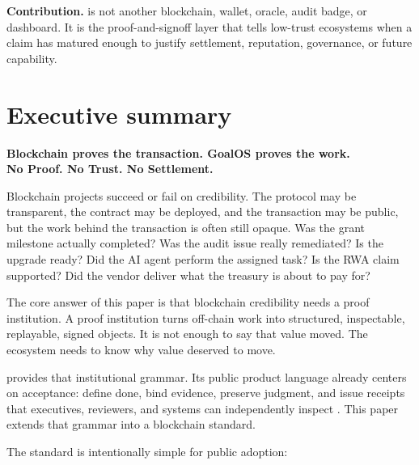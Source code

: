 \begin{thesisbox}
\textbf{Contribution.} \Signoff{} is not another blockchain, wallet, oracle, audit badge, or dashboard. It is the proof-and-signoff layer that tells low-trust ecosystems when a claim has matured enough to justify settlement, reputation, governance, or future capability.
\end{thesisbox}

\tableofcontents
\newpage
{}

\section{Executive summary}

\begin{standardbox}
\begin{center}
{\Large\bfseries Blockchain proves the transaction. GoalOS proves the work.}\\[4pt]
{\large\bfseries No Proof. No Trust. No Settlement.}
\end{center}
\end{standardbox}

Blockchain projects succeed or fail on credibility. The protocol may be transparent, the contract may be deployed, and the transaction may be public, but the work behind the transaction is often still opaque. Was the grant milestone actually completed? Was the audit issue really remediated? Is the upgrade ready? Did the AI agent perform the assigned task? Is the RWA claim supported? Did the vendor deliver what the treasury is about to pay for?

The core answer of this paper is that blockchain credibility needs a proof institution. A proof institution turns off-chain work into structured, inspectable, replayable, signed objects. It is not enough to say that value moved. The ecosystem needs to know why value deserved to move.

\Signoff{} provides that institutional grammar. Its public product language already centers on acceptance: define done, bind evidence, preserve judgment, and issue receipts that executives, reviewers, and systems can independently inspect \citep{goalosSignoffSite}. This paper extends that grammar into a blockchain standard.

The standard is intentionally simple for public adoption:
\begin{center}
\end{center}

